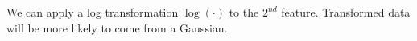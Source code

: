 \begin{answer}
We can apply a log transformation $\log(\cdot)$ to the $2^{nd}$ feature. Transformed data will be more likely to come from a Gaussian. \\
\end{answer}
